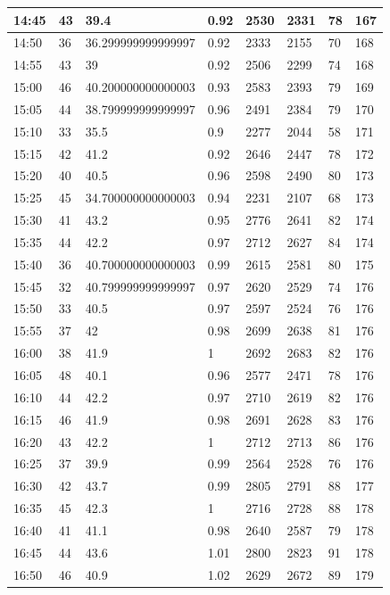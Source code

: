 \documentclass[
]{book}
\begin{document}
\begin{tabular}{l|l|l|l|l|l|l|l}
\hline
14:45 & 43 & 39.4 & 0.92 & 2530 & 2331 & 78 & 167\\
\hline
14:50 & 36 & 36.299999999999997 & 0.92 & 2333 & 2155 & 70 & 168\\
\hline
14:55 & 43 & 39 & 0.92 & 2506 & 2299 & 74 & 168\\
\hline
15:00 & 46 & 40.200000000000003 & 0.93 & 2583 & 2393 & 79 & 169\\
\hline
15:05 & 44 & 38.799999999999997 & 0.96 & 2491 & 2384 & 79 & 170\\
\hline
15:10 & 33 & 35.5 & 0.9 & 2277 & 2044 & 58 & 171\\
\hline
15:15 & 42 & 41.2 & 0.92 & 2646 & 2447 & 78 & 172\\
\hline
15:20 & 40 & 40.5 & 0.96 & 2598 & 2490 & 80 & 173\\
\hline
15:25 & 45 & 34.700000000000003 & 0.94 & 2231 & 2107 & 68 & 173\\
\hline
15:30 & 41 & 43.2 & 0.95 & 2776 & 2641 & 82 & 174\\
\hline
15:35 & 44 & 42.2 & 0.97 & 2712 & 2627 & 84 & 174\\
\hline
15:40 & 36 & 40.700000000000003 & 0.99 & 2615 & 2581 & 80 & 175\\
\hline
15:45 & 32 & 40.799999999999997 & 0.97 & 2620 & 2529 & 74 & 176\\
\hline
15:50 & 33 & 40.5 & 0.97 & 2597 & 2524 & 76 & 176\\
\hline
15:55 & 37 & 42 & 0.98 & 2699 & 2638 & 81 & 176\\
\hline
16:00 & 38 & 41.9 & 1 & 2692 & 2683 & 82 & 176\\
\hline
16:05 & 48 & 40.1 & 0.96 & 2577 & 2471 & 78 & 176\\
\hline
16:10 & 44 & 42.2 & 0.97 & 2710 & 2619 & 82 & 176\\
\hline
16:15 & 46 & 41.9 & 0.98 & 2691 & 2628 & 83 & 176\\
\hline
16:20 & 43 & 42.2 & 1 & 2712 & 2713 & 86 & 176\\
\hline
16:25 & 37 & 39.9 & 0.99 & 2564 & 2528 & 76 & 176\\
\hline
16:30 & 42 & 43.7 & 0.99 & 2805 & 2791 & 88 & 177\\
\hline
16:35 & 45 & 42.3 & 1 & 2716 & 2728 & 88 & 178\\
\hline
16:40 & 41 & 41.1 & 0.98 & 2640 & 2587 & 79 & 178\\
\hline
16:45 & 44 & 43.6 & 1.01 & 2800 & 2823 & 91 & 178\\
\hline
16:50 & 46 & 40.9 & 1.02 & 2629 & 2672 & 89 & 179\\

\end{tabular}
\end{document}
